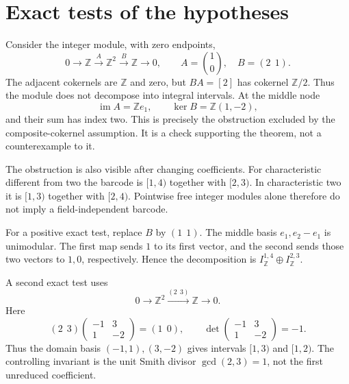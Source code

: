 \documentclass[10pt]{article}
\begin{document}
\section*{Exact tests of the hypotheses}
Consider the integer module, with zero endpoints, \[0\longrightarrow\mathbb Z
 \xrightarrow{A}\mathbb Z^2
 \xrightarrow{B}\mathbb Z\longrightarrow0,\qquad
 A=\binom10,\quad B=(2\ \ 1).\] The adjacent cokernels are \(\mathbb Z\) and zero, but \(BA=[2]\) has cokernel \(\mathbb Z/2\). Thus the module does not decompose into integral intervals. At the middle node \[\operatorname{im}A=\mathbb Ze_1,\qquad \ker B=\mathbb Z(1,-2),\] and their sum has index two. This is precisely the obstruction excluded by the composite-cokernel assumption. It is a check supporting the theorem, not a counterexample to it.\par
The obstruction is also visible after changing coefficients. For characteristic different from two the barcode is \([1,4)\) together with \([2,3)\). In characteristic two it is \([1,3)\) together with \([2,4)\). Pointwise free integer modules alone therefore do not imply a field-independent barcode.\par
For a positive exact test, replace \(B\) by \((1\ \ 1)\). The middle basis \(e_1,e_2-e_1\) is unimodular. The first map sends \(1\) to its first vector, and the second sends those two vectors to \(1,0\), respectively. Hence the decomposition is \(I_{\mathbb Z}^{1,4}\oplus I_{\mathbb Z}^{2,3}\).\par
A second exact test uses \[0\longrightarrow\mathbb Z^2
 \xrightarrow{(2\ \ 3)}\mathbb Z\longrightarrow0.\] Here \[(2\ \ 3)
 \begin{pmatrix}-1&3\\1&-2\end{pmatrix}
 =(1\ \ 0),\qquad
 \det\begin{pmatrix}-1&3\\1&-2\end{pmatrix}=-1.\] Thus the domain basis \((-1,1),(3,-2)\) gives intervals \([1,3)\) and \([1,2)\). The controlling invariant is the unit Smith divisor \(\gcd(2,3)=1\), not the first unreduced coefficient.\par
\end{document}
